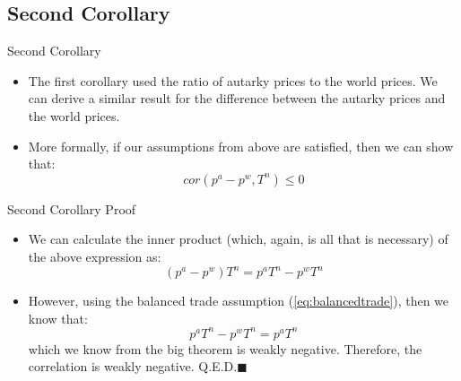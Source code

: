 \documentclass[aspectratio=169]{beamer}
\begin{document}

\subsection{Second Corollary}


\begin{frame}{Second Corollary}

\begin{itemize}
    \item<1-> The first corollary used the ratio of autarky prices to the world prices.  We can derive a similar result for the difference between the autarky prices and the world prices.
    \item<2-> More formally, if our assumptions from above are satisfied, then we can show that:
    \begin{equation*}
        cor \left( p^{a} - p^{w}, T^{n} \right) \le 0
    \end{equation*}
\end{itemize}
    
\end{frame}


\begin{frame}{Second Corollary Proof}

\begin{itemize}
    \item<1-> We can calculate the inner product (which, again, is all that is necessary) of the above expression as:
    \begin{equation*}
        \left( p^{a} - p^{w} \right) T^{n} = p^{a} T^{n} - p^{w} T^{n}
    \end{equation*}
    \item<2-> However, using the balanced trade assumption (\ref{eq:balancedtrade}), then we know that:
    \begin{equation*}
        p^{a} T^{n} - p^{w} T^{n} = p^{a} T^{n}
    \end{equation*}
    which we know from the big theorem is weakly negative.  Therefore, the correlation is weakly negative.  Q.E.D.$\blacksquare$
\end{itemize}
    
\end{frame}
\end{document}
